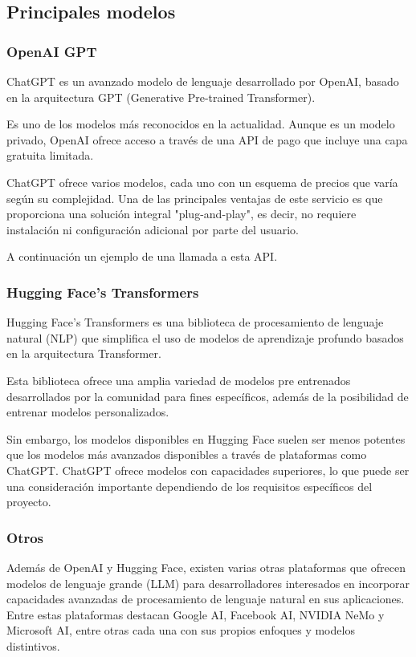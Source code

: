 \subsection*{Principales modelos}

\subsubsection*{OpenAI GPT}
ChatGPT es un avanzado modelo de lenguaje desarrollado por OpenAI,
basado en la arquitectura GPT (Generative Pre-trained Transformer).

Es uno de los modelos más reconocidos en la actualidad. Aunque es un modelo privado, OpenAI ofrece
acceso a través de una API de pago que incluye una capa gratuita limitada.

ChatGPT ofrece varios modelos, cada uno con un esquema de precios que varía según
su complejidad. Una de las principales ventajas de este servicio
es que proporciona una solución integral "plug-and-play",
es decir, no requiere instalación ni configuración adicional por parte del usuario.

A continuación un ejemplo de una llamada a esta API.


\subsubsection*{Hugging Face's Transformers}
Hugging Face's Transformers
es una biblioteca de procesamiento de lenguaje natural (NLP) que simplifica el uso de modelos de aprendizaje profundo
basados en la arquitectura Transformer.

Esta biblioteca ofrece una amplia variedad de modelos pre entrenados desarrollados por la comunidad
para fines específicos, además de la posibilidad de entrenar modelos personalizados.


Sin embargo, los modelos disponibles en Hugging Face suelen ser menos potentes que los modelos más
avanzados disponibles a través de plataformas como ChatGPT. ChatGPT ofrece
modelos con capacidades superiores, lo que puede ser una
consideración importante dependiendo de los requisitos específicos del proyecto.

\subsubsection*{Otros}
Además de OpenAI y Hugging Face, existen varias otras plataformas que ofrecen modelos de lenguaje
grande (LLM) para desarrolladores interesados en incorporar capacidades
avanzadas de procesamiento de lenguaje natural en sus aplicaciones. Entre
estas plataformas destacan Google AI, Facebook AI, NVIDIA NeMo y Microsoft AI, entre otras cada una con sus propios
enfoques y modelos distintivos.

